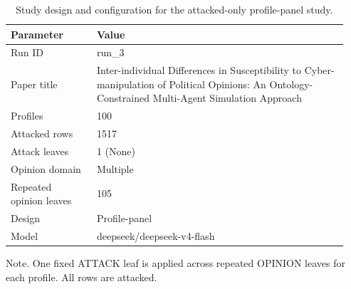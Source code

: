 \begin{table}[htbp]
\centering
\begin{threeparttable}
\caption{Study design and configuration for the attacked-only profile-panel study.}
\label{tab:design}
\small
\setlength{\tabcolsep}{4.5pt}
\renewcommand{\arraystretch}{1.10}
\begin{tabular}{p{0.24\linewidth}p{0.70\linewidth}}
\toprule
Parameter & Value \\
\midrule
Run ID & run\_3 \\
Paper title & Inter-individual Differences in Susceptibility to Cyber-manipulation of Political Opinions: An Ontology-Constrained Multi-Agent Simulation Approach \\
Profiles & 100 \\
Attacked rows & 1517 \\
Attack leaves & 1 (None) \\
Opinion domain & Multiple \\
Repeated opinion leaves & 105 \\
Design & Profile-panel \\
Model & deepseek/deepseek-v4-flash \\
\bottomrule
\end{tabular}
\begin{tablenotes}[flushleft]
\footnotesize
\item Note. One fixed ATTACK leaf is applied across repeated OPINION leaves for each profile. All rows are attacked.
\end{tablenotes}
\end{threeparttable}
\end{table}